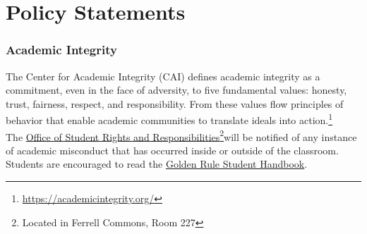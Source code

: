 \documentclass[11pt]{paper}
\begin{document}
\section*{Policy Statements}
\subsubsection*{Academic Integrity}
The Center for Academic Integrity (CAI) defines academic integrity as a commitment, even in the face of adversity, to five fundamental values: honesty, trust, fairness, respect, and responsibility. From these values flow principles of behavior that enable academic communities to translate ideals into action.\footnote{\url{https://academicintegrity.org/}}\\

The \href{https://osrr.sdes.ucf.edu/}{Office of Student Rights and Responsibilities}\footnote{Located in Ferrell Commons, Room 227}will be notified of any instance of academic misconduct that has occurred inside or outside of the classroom. Students are encouraged to read the \href{https://goldenrule.sdes.ucf.edu/}{Golden Rule Student Handbook}.\\
\end{document}
